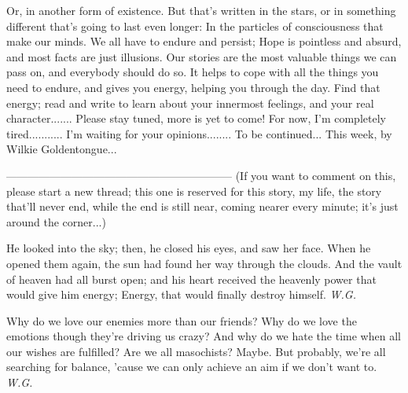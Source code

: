 Or, in another form of existence. 
But that's written in the stars, or in something different that's going to last even longer: In the particles of consciousness that make our minds. 
We all have to endure and persist; Hope is pointless and absurd, and most facts are just illusions. 
Our stories are the most valuable things we can pass on, and everybody should do so. 
It helps to cope with all the things you need to endure, and gives you energy, helping you through the day. 
Find that energy; read and write to learn about your innermost feelings, and your real character.......
Please stay tuned, more is yet to come!
For now, I'm completely tired...........
I'm waiting for your opinions........
To be continued...
This week, by Wilkie Goldentongue...

--------------------------------------------------------------
(If you want to comment on this, please start a new thread; this one is reserved for this story, my life, the story that'll never end, while the end is still near, coming nearer every minute; it's just around the corner...)

He looked into the sky; 
then, he closed his eyes, 
and saw her face. 
When he opened them again, 
the sun had found her way 
through the clouds. 
And the vault of heaven 
had all burst open; 
and his heart received 
the heavenly power 
that would give him energy; 
Energy, that would finally 
destroy himself. 
\emph{W.G.}

Why do we love our enemies more than our friends? 
Why do we love the emotions though they're driving us crazy? 
And why do we hate the time when all our wishes are fulfilled? 
Are we all masochists?
Maybe. 
But probably, we're all searching for balance, 
'cause we can only achieve an aim
if we don't want to. 
\emph{W.G.}

